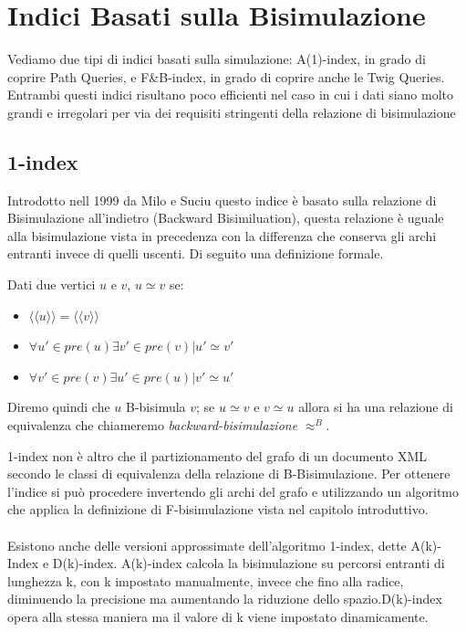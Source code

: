 \section{Indici Basati sulla Bisimulazione}
Vediamo due tipi di indici basati sulla simulazione: A(1)-index, in grado di coprire Path Queries, e F\&B-index, in grado di coprire anche le Twig Queries.
Entrambi questi indici risultano poco efficienti nel caso in cui i dati siano molto grandi e irregolari per via dei requisiti stringenti della relazione di bisimulazione
\subsection{1-index}
Introdotto nell 1999 da Milo e Suciu questo indice è basato sulla relazione di Bisimulazione all'indietro (Backward Bisimiluation), questa relazione è uguale alla bisimulazione vista in precedenza con la differenza che conserva gli archi entranti invece di quelli uscenti. Di seguito una definizione formale.
\begin{definition}
Dati due vertici $u$ e $v$, $u \simeq v$ se:
\begin{itemize}
\item $\langle\langle u \rangle\rangle = \langle\langle v \rangle\rangle$
\item $\forall u' \in pre(u) \exists v' \in pre(v) | u' \simeq v'$
\item $\forall v' \in pre(v) \exists u' \in pre(u) | v' \simeq u'$
\end{itemize}
Diremo quindi che $u$ B-bisimula $v$; se $u \simeq v$ e $v \simeq u$ allora si ha una relazione di equivalenza che chiameremo \emph{backward-bisimulazione} $\approx^B$.
\end{definition}
1-index non è altro che il partizionamento del grafo di un documento XML secondo le classi di equivalenza della relazione di B-Bisimulazione. Per ottenere l'indice si può procedere invertendo gli archi del grafo e utilizzando un algoritmo che applica la definizione di F-bisimulazione vista nel capitolo introduttivo.\\\\
Esistono anche delle versioni approssimate dell'algoritmo 1-index, dette A(k)-Index e D(k)-index. A(k)-index calcola la bisimulazione su percorsi entranti di lunghezza k, con k impostato manualmente, invece che fino alla radice, diminuendo la precisione ma aumentando la riduzione dello spazio.D(k)-index opera alla stessa maniera ma il valore di k viene impostato dinamicamente.\\\\
